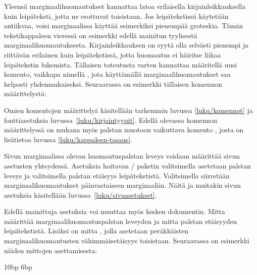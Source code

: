 \noindent
Yleensä marginaalihuomautukset kannattaa latoa erilaisella
kirjainleikkauksella kuin leipäteksti, jotta ne erottuvat toisistaan.
Jos leipätekstissä käytetään antiikvaa, voisi marginaalissa käyttää
esimerkiksi pienempää groteskia. Tämän  tekstikappaleen vieressä on esimerkki edellä
mainitun tyylisestä marginaalihuomautuksesta. Kirjainleikkauksen on
syytä olla selvästi pienempi ja riittävän erilainen kuin leipätekstissä,
jotta huomautus ei häiritse liikaa leipätekstin lukemista. Tällaisen
toteutusta varten kannattaa määritellä uusi komento, vaikkapa nimellä
, jota käyttämällä marginaalihuomautukset saa
helposti yhdenmukaiseksi. Seuraavassa on esimerkki tällaisen komennon
määrittelystä:

\begin{koodilohkosis}
\newcommand{\huomautus}[1]{%
  \marginpar{\sffamily\scriptsize\RaggedRight #1}}
\end{koodilohkosis}

\noindent
Omien komentojen määrittelyä käsitellään tarkemmin luvussa
\ref{luku/komennot} ja fonttiasetuksia luvussa~\ref{luku/kirjaintyypit}.
Edellä olevassa komennon määrittelyssä on mukana myös palstan muotoon
vaikuttava komento , josta on lisätietoa luvussa
\ref{luku/kappaleen-tasaus}.

Sivun marginaalissa olevan huomautuspalstan leveys voidaan määrittää
sivun asetusten yhteydessä. Asetuksia hoitavan \-/
paketin valitsimella  asetetaan palstan leveys ja
valitsimella  palstan etäisyys leipätekstistä.
Valitsimella  siirretään marginaalihuomautukset
päinvastaiseen marginaaliin. Näitä ja muitakin sivun asetuksia
käsitellään luvussa~\ref{luku/sivuasetukset}.

Edellä mainittuja asetuksia voi muuttaa myös kesken dokumentin. Mitta
 määrittää marginaalihuomautuspalstan leveyden ja
mitta  palstan etäisyyden leipätekstistä. Lisäksi on
mitta , jolla asetetaan peräkkäisten
marginaalihuomautusten vähimmäisetäisyys toisistaan. Seuraavassa on
esimerkki näiden mittojen asettamisesta:

\begin{koodilohkosis}
\setlength{\marginparwidth}{50bp}
\setlength{\marginparsep}  {10bp}
\setlength{\marginparpush}  {6bp}
\end{koodilohkosis}

